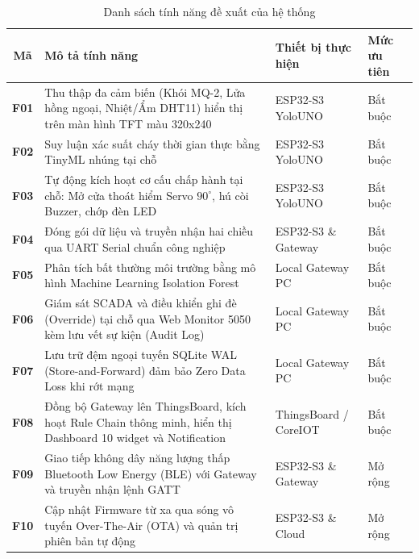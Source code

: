 \begin{table}[H]
\centering
\small
\setlength{\tabcolsep}{4pt}
\renewcommand{\arraystretch}{1.25}
\caption{Danh sách tính năng đề xuất của hệ thống}
\label{tab:danh_sach_tinh_nang}
\begin{tabularx}{\textwidth}{|c|>{\raggedright\arraybackslash}X|>{\centering\arraybackslash}p{2.7cm}|>{\centering\arraybackslash}p{1.6cm}|}
\hline
\textbf{Mã} & \textbf{Mô tả tính năng} & \textbf{Thiết bị thực hiện} & \textbf{Mức ưu tiên} \\ \hline
\textbf{F01} & Thu thập đa cảm biến (Khói MQ-2, Lửa hồng ngoại, Nhiệt/Ẩm DHT11) hiển thị trên màn hình TFT màu 320x240 & ESP32-S3 YoloUNO & Bắt buộc \\ \hline
\textbf{F02} & Suy luận xác suất cháy thời gian thực bằng TinyML nhúng tại chỗ & ESP32-S3 YoloUNO & Bắt buộc \\ \hline
\textbf{F03} & Tự động kích hoạt cơ cấu chấp hành tại chỗ: Mở cửa thoát hiểm Servo $90^\circ$, hú còi Buzzer, chớp đèn LED & ESP32-S3 YoloUNO & Bắt buộc \\ \hline
\textbf{F04} & Đóng gói dữ liệu và truyền nhận hai chiều qua UART Serial chuẩn công nghiệp & ESP32-S3 \& Gateway & Bắt buộc \\ \hline
\textbf{F05} & Phân tích bất thường môi trường bằng mô hình Machine Learning Isolation Forest & Local Gateway PC & Bắt buộc \\ \hline
\textbf{F06} & Giám sát SCADA và điều khiển ghi đè (Override) tại chỗ qua Web Monitor 5050 kèm lưu vết sự kiện (Audit Log) & Local Gateway PC & Bắt buộc \\ \hline
\textbf{F07} & Lưu trữ đệm ngoại tuyến SQLite WAL (Store-and-Forward) đảm bảo Zero Data Loss khi rớt mạng & Local Gateway PC & Bắt buộc \\ \hline
\textbf{F08} & Đồng bộ Gateway lên ThingsBoard, kích hoạt Rule Chain thông minh, hiển thị Dashboard 10 widget và Notification & ThingsBoard / CoreIOT & Bắt buộc \\ \hline
\textbf{F09} & Giao tiếp không dây năng lượng thấp Bluetooth Low Energy (BLE) với Gateway và truyền nhận lệnh GATT & ESP32-S3 \& Gateway & Mở rộng \\ \hline
\textbf{F10} & Cập nhật Firmware từ xa qua sóng vô tuyến Over-The-Air (OTA) và quản trị phiên bản tự động & ESP32-S3 \& Cloud & Mở rộng \\ \hline
\end{tabularx}
\end{table}

